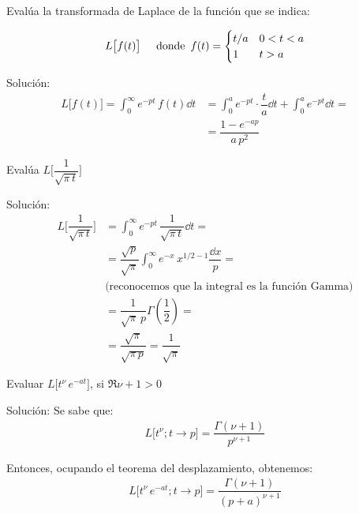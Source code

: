 Evalúa la transformada de Laplace de la función que se indica:
\begin{ejemplo}
\begin{align*}
L\big[f(t)\big] \hspace{0.5cm} \mbox{donde} \hspace{0.5em} f(t) = \begin{cases}
t/a & 0 < t < a \\
1 & t > a
\end{cases}
\end{align*}

Solución:
\begin{align*}
L\big[f(t)\big] = \int_{0}^{\infty} e^{-p t} \, f(t) \dd{t}  &= \int_{0}^{a} e^{-p t} \cdot \dfrac{t}{a} \dd{t} + \int_{0}^{a} e^{-p t} \dd{t} = \\[0.5em]
&=\dfrac{1 - e^{- a p}}{a \, p^{2}}
\end{align*}
\end{ejemplo}

\begin{ejemplo}
Evalúa $L \bigg[\dfrac{1}{\sqrt{\pi \, t}}\bigg]$

Solución:
\begin{align*}
L \bigg[\dfrac{1}{\sqrt{\pi \, t}}\bigg] &= \int_{0}^{\infty} e^{- p t} \, \dfrac{1}{\sqrt{\pi \, t}} \dd{t} = \\[0.5em]
&= \dfrac{\sqrt{p}}{\sqrt{\pi}} \int_{0}^{\infty} e^{-x} \, x^{1/2 - 1} \dfrac{\dd{x}}{p} = \\[0.5em]
&\mbox{(reconocemos que la integral es la función Gamma)} \\[0.5em]
&= \dfrac{1}{\sqrt{\pi} \, p} \Gamma \left( \dfrac{1}{2} \right) = \\[0.5em]
&= \dfrac{\sqrt{\pi}}{\sqrt{\pi \, p}} = \dfrac{1}{\sqrt{\pi}}
\end{align*}
\end{ejemplo}

\begin{ejemplo}
Evaluar $L \big[t^{\nu} \, e^{-a t} \big]$, si $\Re{\nu + 1} > 0$

Solución: Se sabe que:
\begin{align*}
L \big[t^{\nu}; t \to p\big] = \dfrac{\Gamma (\nu + 1)}{p^{\nu+1}}
\end{align*}

Entonces, ocupando el teorema del desplazamiento, obtenemos:
\begin{align*}
L \big[t^{\nu} \, e^{-a t}; t \to p\big] = \dfrac{\Gamma (\nu + 1)}{(p + a)^{\nu+1}}
\end{align*}
\end{ejemplo}

